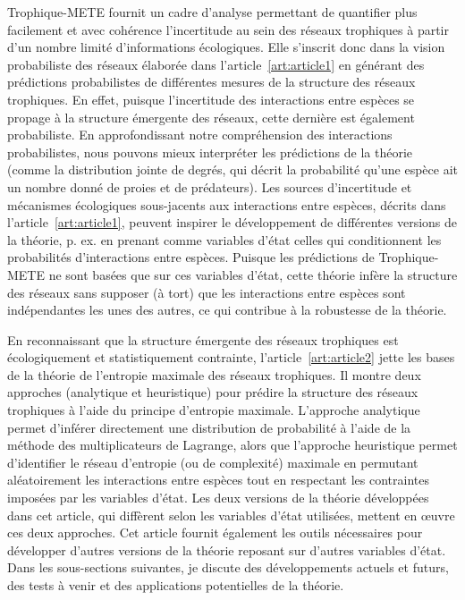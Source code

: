 Trophique-METE fournit un cadre d'analyse permettant de quantifier plus
facilement et avec cohérence l'incertitude au sein des réseaux trophiques à
partir d'un nombre limité d'informations écologiques. Elle s'inscrit donc dans
la vision probabiliste des réseaux élaborée dans l'article~\ref{art:article1} en
générant des prédictions probabilistes de différentes mesures de la structure
des réseaux trophiques. En effet, puisque l'incertitude des interactions entre
espèces se propage à la structure émergente des réseaux, cette dernière est
également probabiliste. En approfondissant notre compréhension des interactions
probabilistes, nous pouvons mieux interpréter les prédictions de la théorie
(comme la distribution jointe de degrés, qui décrit la probabilité qu'une espèce
ait un nombre donné de proies et de prédateurs). Les sources d'incertitude et
mécanismes écologiques sous-jacents aux interactions entre espèces, décrits dans
l'article~\ref{art:article1}, peuvent inspirer le développement de différentes
versions de la théorie, p. ex. en prenant comme variables d'état celles qui
conditionnent les probabilités d'interactions entre espèces. Puisque les
prédictions de Trophique-METE ne sont basées que sur ces variables d'état, cette
théorie infère la structure des réseaux sans supposer (à tort) que les
interactions entre espèces sont indépendantes les unes des autres, ce qui
contribue à la robustesse de la théorie.

En reconnaissant que la structure émergente des réseaux trophiques est
écologiquement et statistiquement contrainte, l'article~\ref{art:article2} jette
les bases de la théorie de l'entropie maximale des réseaux trophiques. Il montre
deux approches (analytique et heuristique) pour prédire la structure des réseaux
trophiques à l'aide du principe d'entropie maximale. L'approche analytique
permet d'inférer directement une distribution de probabilité à l'aide de la
méthode des multiplicateurs de Lagrange, alors que l'approche heuristique permet
d'identifier le réseau d'entropie (ou de complexité) maximale en permutant
aléatoirement les interactions entre espèces tout en respectant les contraintes
imposées par les variables d'état. Les deux versions de la théorie développées
dans cet article, qui diffèrent selon les variables d'état utilisées, mettent en
œuvre ces deux approches. Cet article fournit également les outils nécessaires
pour développer d'autres versions de la théorie reposant sur d'autres variables
d'état. Dans les sous-sections suivantes, je discute des développements actuels
et futurs, des tests à venir et des applications potentielles de la théorie. 

